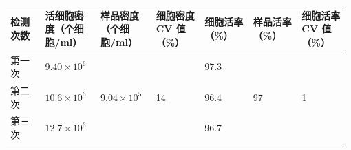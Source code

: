 \documentclass[UTF8,10pt,a4paper,fontset=fandol]{ctexart}
\newcommand{\fieldvalue}[1]{#1}
\newcommand{\handwritten}[1]{#1}
\begin{document}
\medskip

\noindent
\begin{tabular}{|p{0.10\linewidth}|p{0.16\linewidth}|p{0.16\linewidth}|p{0.14\linewidth}|p{0.14\linewidth}|p{0.14\linewidth}|p{0.14\linewidth}|}
\hline
检测次数
& 活细胞密度（个细胞/ml）
& 样品密度（个细胞/ml）
& 细胞密度 CV 值（\%）
& 细胞活率（\%）
& 样品活率（\%）
& 细胞活率 CV 值（\%）\\
\hline
第一次
&
\fieldvalue{\handwritten{$9.40\times 10^{6}$}}
&
&
&
\fieldvalue{\handwritten{97.3}}
&
&\\
\hline
第二次
&
\fieldvalue{\handwritten{$10.6\times 10^{6}$}}
&
\fieldvalue{\handwritten{$9.04\times 10^{5}$}}
&
\fieldvalue{\handwritten{14}}
&
\fieldvalue{\handwritten{96.4}}
&
\fieldvalue{\handwritten{97}}
&
\fieldvalue{\handwritten{1}}\\
\hline
第三次
&
\fieldvalue{\handwritten{$12.7\times 10^{6}$}}
&
&
&
\fieldvalue{\handwritten{96.7}}
&
&\\
\hline
\end{tabular}

\medskip
\end{document}
